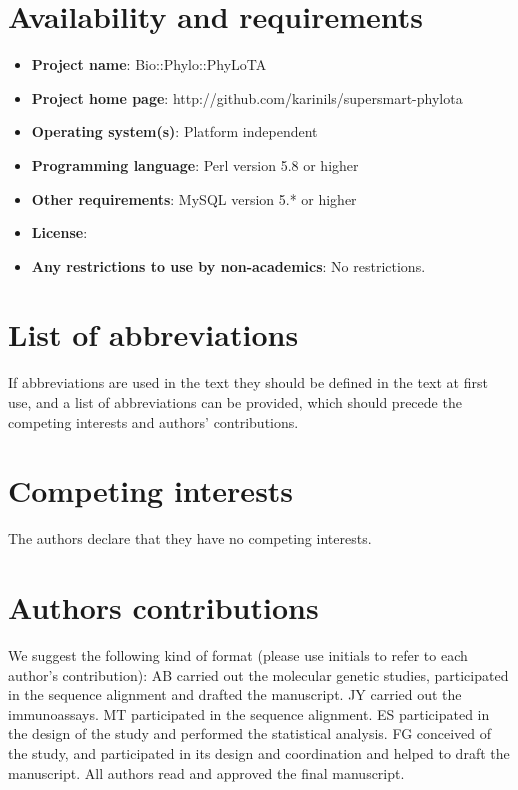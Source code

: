 \documentclass[10pt]{bmc_article}
\newenvironment{bmcformat}{\begin{raggedright}\baselineskip20pt\sloppy\setboolean{publ}{false}}{\end{raggedright}\baselineskip20pt\sloppy}
\begin{document}
\begin{bmcformat}
\section*{Availability and requirements}
\begin{itemize}
\item
\textbf{Project name}: Bio::Phylo::PhyLoTA
\item
\textbf{Project home page}: http://github.com/karinils/supersmart-phylota
\item
\textbf{Operating system(s)}: Platform independent
\item
\textbf{Programming language}: Perl version 5.8 or higher
\item
\textbf{Other requirements}: MySQL version 5.* or higher
\item
\textbf{License}: %
\item
\textbf{Any restrictions to use by non-academics}: No restrictions.
\end{itemize}


\section*{List of abbreviations}
If abbreviations are used in the text they should be defined in the text at first use, 
and a list of abbreviations can be provided, which should precede the competing interests 
and authors' contributions.

\section*{Competing interests}
The authors declare that they have no competing interests.

\section*{Authors contributions}
We suggest the following kind of format (please use initials to refer to each author's 
contribution): AB carried out the molecular genetic studies, participated in the sequence 
alignment and drafted the manuscript. JY carried out the immunoassays. MT participated in 
the sequence alignment. ES participated in the design of the study and performed the 
statistical analysis. FG conceived of the study, and participated in its design and 
coordination and helped to draft the manuscript. All authors read and approved the final 
manuscript.    


\end{bmcformat}
\end{document}
